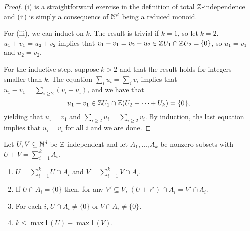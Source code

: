 \begin{proof}
	(i) is a straightforward exercise in the definition of total $\mathbb{Z}$-independence and (ii) is simply a consequence of $\mathbb{N}^d$ being a reduced monoid.
	
	For (iii), we can induct on $k$.
	The result is trivial if $k = 1$, so let $k=2$.
	$u_1 + v_1 = u_2 + v_2$ implies that $u_1 - v_1 = v_2 - u_2 \in \mathbb{Z} U_1 \cap \mathbb{Z} U_2 = \{0\}$, so $u_1 = v_1$ and $u_2 = v_2$.
	
	For the inductive step, suppose $k>2$ and that the result holds for integers smaller than $k$.
	The equation $\sum_i u_i = \sum_i v_i$ implies that $u_1 - v_1 = \sum_{i\ge 2} (v_i - u_i)$, and we have that 
	\[u_1 - v_1 \in \mathbb{Z} U_1 \cap \mathbb{Z}(U_2+\cdots+U_k) = \{0\},\]
	yielding that $u_1 = v_1$ and $\sum_{i\ge 2} u_i = \sum_{i\ge 2} v_i$.
	By induction, the last equation implies that $u_i = v_i$ for all $i$ and we are done.
\end{proof}

\begin{prop} \label{prop:indep-decomp}
	Let $U,V \subseteq \mathbb{N}^d$ be $\mathbb{Z}$-independent and let $A_1,\dots, A_k$ be nonzero subsets with $U+V = \sum_{i=1}^k A_i$.
	\begin{enumerate}[label={\rm (\roman{*})}]
		\item $U = \sum_{i=1}^k U\cap A_i$ and $V = \sum_{i=1}^k V\cap A_i$.
		\item If $U \cap A_i = \{0\}$ then, for any $V'\subseteq V$, $(U+V')\cap A_i = V'\cap A_i$.
		\item For each $i$, $U\cap A_i \neq \{0\}$ or $V \cap A_i \neq \{0\}$.
		\item $k \le \max \mathsf{L}(U) + \max \mathsf{L}(V)$.
	\end{enumerate}
\end{prop}

